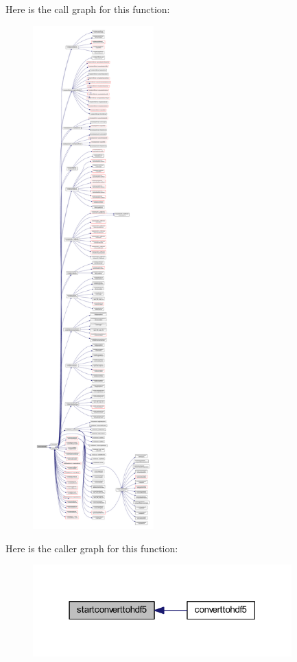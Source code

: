 Here is the call graph for this function\+:\nopagebreak
\begin{figure}[H]
\begin{center}
\leavevmode
\includegraphics[height=550pt]{_convert_to_h_d_f5_8_f90_aae05b4c91bf88e26202fcc1b279beddf_cgraph}
\end{center}
\end{figure}
Here is the caller graph for this function\+:\nopagebreak
\begin{figure}[H]
\begin{center}
\leavevmode
\includegraphics[width=283pt]{_convert_to_h_d_f5_8_f90_aae05b4c91bf88e26202fcc1b279beddf_icgraph}
\end{center}
\end{figure}
\mbox{\label{_convert_to_h_d_f5_8_f90_a76e597f0cbb118ca396467443f56d32c}} 
